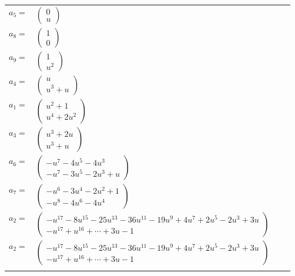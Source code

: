 \documentclass[1p]{elsarticle_modified}
\theoremstyle{definition}
\begin{document}
\begin{tabular}{m{7pt} m{180pt} m{7pt} m{180pt} }
\flushright $a_{5}=$&$\begin{pmatrix}0\\u\end{pmatrix}$ \\
\flushright $a_{8}=$&$\begin{pmatrix}1\\0\end{pmatrix}$ \\
\flushright $a_{9}=$&$\begin{pmatrix}1\\u^2\end{pmatrix}$ \\
\flushright $a_{4}=$&$\begin{pmatrix}u\\u^3+u\end{pmatrix}$ \\
\flushright $a_{1}=$&$\begin{pmatrix}u^2+1\\u^4+2 u^2\end{pmatrix}$ \\
\flushright $a_{3}=$&$\begin{pmatrix}u^3+2 u\\u^3+u\end{pmatrix}$ \\
\flushright $a_{6}=$&$\begin{pmatrix}- u^7-4 u^5-4 u^3\\- u^7-3 u^5-2 u^3+u\end{pmatrix}$ \\
\flushright $a_{7}=$&$\begin{pmatrix}- u^6-3 u^4-2 u^2+1\\- u^8-4 u^6-4 u^4\end{pmatrix}$ \\
\flushright $a_{2}=$&$\begin{pmatrix}- u^{17}-8 u^{15}-25 u^{13}-36 u^{11}-19 u^9+4 u^7+2 u^5-2 u^3+3 u\\- u^{17}+u^{16}+\cdots+3 u-1\end{pmatrix}$\\ \flushright $a_{2}=$&$\begin{pmatrix}- u^{17}-8 u^{15}-25 u^{13}-36 u^{11}-19 u^9+4 u^7+2 u^5-2 u^3+3 u\\- u^{17}+u^{16}+\cdots+3 u-1\end{pmatrix}$\\&\end{tabular}
\end{document}
